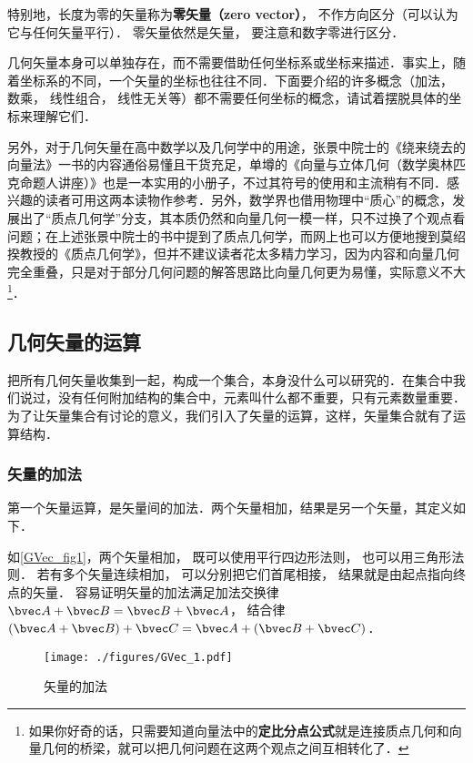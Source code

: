特别地，长度为零的矢量称为\textbf{零矢量（zero vector）}， 不作方向区分（可以认为它与任何矢量平行）． 零矢量依然是矢量， 要注意和数字零进行区分．

几何矢量本身可以单独存在，而不需要借助任何坐标系或坐标来描述．事实上，随着坐标系的不同，一个矢量的坐标也往往不同．下面要介绍的许多概念（加法， 数乘， 线性组合， 线性无关等）都不需要任何坐标的概念，请试着摆脱具体的坐标来理解它们．

另外，对于几何矢量在高中数学以及几何学中的用途，张景中院士的《绕来绕去的向量法》一书的内容通俗易懂且干货充足，单墫的《向量与立体几何（数学奥林匹克命题人讲座）》也是一本实用的小册子，不过其符号的使用和主流稍有不同．感兴趣的读者可用这两本读物作参考．另外，数学界也借用物理中“质心”的概念，发展出了“质点几何学”分支，其本质仍然和向量几何一模一样，只不过换了个观点看问题；在上述张景中院士的书中提到了质点几何学，而网上也可以方便地搜到莫绍揆教授的《质点几何学》，但并不建议读者花太多精力学习，因为内容和向量几何完全重叠，只是对于部分几何问题的解答思路比向量几何更为易懂，实际意义不大\footnote{如果你好奇的话，只需要知道向量法中的\textbf{定比分点公式}就是连接质点几何和向量几何的桥梁，就可以把几何问题在这两个观点之间互相转化了．}．

\subsection{几何矢量的运算}

把所有几何矢量收集到一起，构成一个集合，本身没什么可以研究的．在集合中我们说过，没有任何附加结构的集合中，元素叫什么都不重要，只有元素数量重要．为了让矢量集合有讨论的意义，我们引入了矢量的运算，这样，矢量集合就有了运算结构．

\subsubsection{矢量的加法}
第一个矢量运算，是矢量间的加法．两个矢量相加，结果是另一个矢量，其定义如下．

如\autoref{GVec_fig1}，两个矢量相加， 既可以使用平行四边形法则， 也可以用三角形法则． 若有多个矢量连续相加， 可以分别把它们首尾相接， 结果就是由起点指向终点的矢量． 容易证明矢量的加法满足加法交换律 $\bvec A + \bvec B = \bvec B + \bvec A$， 结合律 $(\bvec A + \bvec B) + \bvec C = \bvec A + (\bvec B + \bvec C)$．
\begin{figure}[ht]
\centering
\texttt{[image: ./figures/GVec\_1.pdf]}
\caption{矢量的加法} \label{GVec_fig1}
\end{figure}

